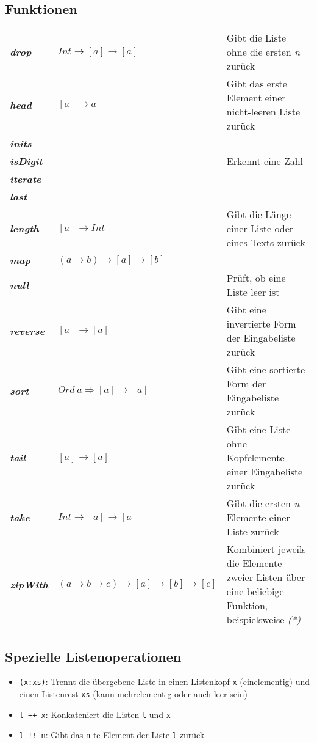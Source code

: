 \subsection{Funktionen}
\begin{table}[H]
\begin{tabularx}{\textwidth}{l|X|X}
	\textbf{\textit{drop}} & \(Int \rightarrow [a] \rightarrow [a]\) & Gibt die Liste ohne die ersten \textit{n} zurück \\
	\textbf{\textit{head}} & \([a] \rightarrow a\) & Gibt das erste Element einer nicht-leeren Liste zurück \\
	\textbf{\textit{inits}} & & \\
	\textbf{\textit{isDigit}} & & Erkennt eine Zahl \\
	\textbf{\textit{iterate}} & & \\
	\textbf{\textit{last}} & & \\
	\textbf{\textit{length}} & \([a] \rightarrow Int\) & Gibt die Länge einer Liste oder eines Texts zurück \\
	\textbf{\textit{map}} & \((a \rightarrow b) \rightarrow [a] \rightarrow [b]\) & \\
	\textbf{\textit{null}} & & Prüft, ob eine Liste leer ist \\
	\textbf{\textit{reverse}} & \([a] \rightarrow [a]\) & Gibt eine invertierte Form der Eingabeliste zurück \\
	\textbf{\textit{sort}} & \(Ord~a \Rightarrow [a] \rightarrow [a]\) & Gibt eine sortierte Form der Eingabeliste zurück \\
	\textbf{\textit{tail}} & \([a] \rightarrow [a]\) & Gibt eine Liste ohne Kopfelemente einer Eingabeliste zurück \\
	\textbf{\textit{take}} & \(Int \rightarrow [a] \rightarrow [a]\) & Gibt die ersten \textit{n} Elemente einer Liste zurück \\
	\textbf{\textit{zipWith}} & \((a \rightarrow b \rightarrow c) \rightarrow [a] \rightarrow [b] \rightarrow [c]\) & Kombiniert jeweils die Elemente zweier Listen über eine beliebige Funktion, beispielsweise \textit{(*)} \\
\end{tabularx}
\end{table}


\subsection{Spezielle Listenoperationen}
\begin{itemize}
	\item \texttt{(x:xs)}: Trennt die übergebene Liste in einen Listenkopf \texttt{x} (einelementig) und einen Listenrest \texttt{xs} (kann mehrelementig oder auch leer sein)
	\item \texttt{l ++ x}: Konkateniert die Listen \texttt{l} und \texttt{x}
	\item \texttt{l !! n}: Gibt das \texttt{n}-te Element der Liste \texttt{l} zurück 
\end{itemize}


